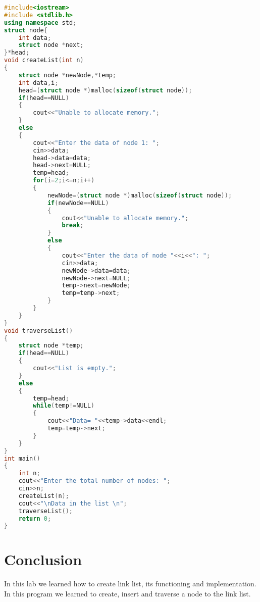 \documentclass[11pt]{article}            %
\begin{document}
\begin{lstlisting}[language=C++]
#include<iostream>
#include <stdlib.h>
using namespace std;
struct node{
    int data;          
    struct node *next; 
}*head;
void createList(int n)
{
    struct node *newNode,*temp;
    int data,i;
	head=(struct node *)malloc(sizeof(struct node));
    if(head==NULL)
    {
        cout<<"Unable to allocate memory.";
    }
    else
    {
        cout<<"Enter the data of node 1: ";
        cin>>data;
        head->data=data;
        head->next=NULL;
        temp=head;
        for(i=2;i<=n;i++)
        {
            newNode=(struct node *)malloc(sizeof(struct node));
            if(newNode==NULL)
            {
                cout<<"Unable to allocate memory.";
                break;
            }
            else
            {
                cout<<"Enter the data of node "<<i<<": ";
                cin>>data;
                newNode->data=data;
                newNode->next=NULL;
                temp->next=newNode;
                temp=temp->next; 
            }
        }
    }
}
void traverseList()
{
    struct node *temp;
    if(head==NULL)
    {
        cout<<"List is empty.";
    }
    else
    {
        temp=head;
        while(temp!=NULL)
        {
            cout<<"Data= "<<temp->data<<endl;
            temp=temp->next;
        }
    }
}
int main()
{
    int n;
	cout<<"Enter the total number of nodes: ";
    cin>>n;
    createList(n);
    cout<<"\nData in the list \n";
    traverseList();
    return 0;
}

\end{lstlisting}

\section{Conclusion}  
In this lab we learned how to create link list, its functioning and implementation. In this program we learned to create, insert and traverse a node to the link list.

 
\end{document}
